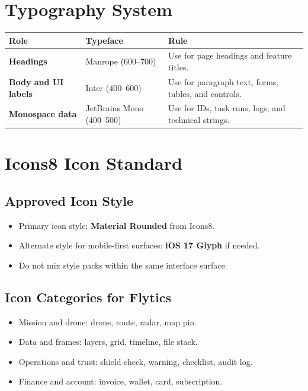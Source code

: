 \documentclass[11pt,a4paper]{article}
\begin{document}
\section{Typography System}

\begin{longtable}{>{\bfseries}p{}p{}p{}}
\toprule
Role & Typeface & Rule \\
\midrule
Headings & Manrope (600--700) & Use for page headings and feature titles. \\
Body and UI labels & Inter (400--600) & Use for paragraph text, forms, tables, and controls. \\
Monospace data & JetBrains Mono (400--500) & Use for IDs, task runs, logs, and technical strings. \\
\bottomrule
\end{longtable}

\section{Icons8 Icon Standard}

\subsection{Approved Icon Style}

\begin{itemize}[leftmargin=*]
    \item Primary icon style: \textbf{Material Rounded} from Icons8.
    \item Alternate style for mobile-first surfaces: \textbf{iOS 17 Glyph} if needed.
    \item Do not mix style packs within the same interface surface.
\end{itemize}

\subsection{Icon Categories for Flytics}

\begin{itemize}[leftmargin=*]
    \item Mission and drone: drone, route, radar, map pin.
    \item Data and frames: layers, grid, timeline, file stack.
    \item Operations and trust: shield check, warning, checklist, audit log.
    \item Finance and account: invoice, wallet, card, subscription.
\end{itemize}
\end{document}
